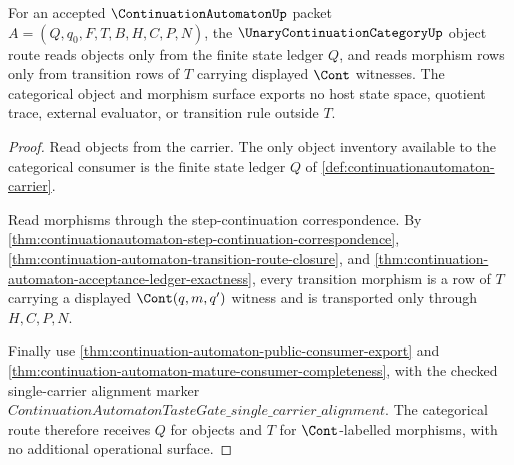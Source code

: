\begin{theorem}
\label{thm:continuation-automaton-unary-category-object-route}
For an accepted $\ContinuationAutomatonUp$ packet $A=(Q,q_0,F,T,B,H,C,P,N)$, the $\UnaryContinuationCategoryUp$ object route reads objects only from the finite state ledger $Q$, and reads morphism rows only from transition rows of $T$ carrying displayed $\Cont$ witnesses. The categorical object and morphism surface exports no host state space, quotient trace, external evaluator, or transition rule outside $T$.
\end{theorem}
\begin{proof}
Read objects from the carrier. The only object inventory available to the categorical consumer is the finite state ledger $Q$ of \autoref{def:continuationautomaton-carrier}.

Read morphisms through the step-continuation correspondence. By \autoref{thm:continuationautomaton-step-continuation-correspondence}, \autoref{thm:continuation-automaton-transition-route-closure}, and \autoref{thm:continuation-automaton-acceptance-ledger-exactness}, every transition morphism is a row of $T$ carrying a displayed $\Cont(q,m,q')$ witness and is transported only through $H,C,P,N$.

Finally use \autoref{thm:continuation-automaton-public-consumer-export} and \autoref{thm:continuation-automaton-mature-consumer-completeness}, with the checked single-carrier alignment marker $ContinuationAutomatonTasteGate\_single\_carrier\_alignment$. The categorical route therefore receives $Q$ for objects and $T$ for $\Cont$-labelled morphisms, with no additional operational surface.
\end{proof}

